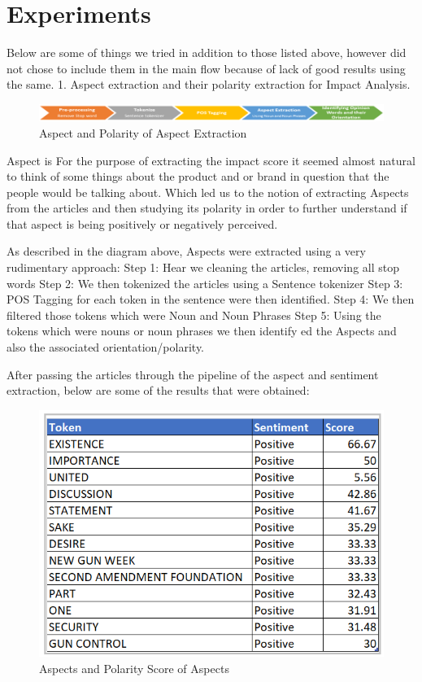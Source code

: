 \documentclass[paper=a4, fontsize=11pt]{scrartcl}
\numberwithin{equation}{section}		%
\numberwithin{figure}{section}			%
\numberwithin{table}{section}				%
\begin{document}
\section{Experiments}
Below are some of things we tried in addition to those listed above, however did not chose to include them in the main flow because of lack of good results using the same.
1. Aspect extraction and their polarity extraction for Impact Analysis. 
\begin{figure}
	\centering
 	 \includegraphics[width=0.6\linewidth]{Aspect_Extraction.png}
	  \caption{Aspect and Polarity of Aspect Extraction}
 	 \label{fig:Aspect Extraction.png}
\end{figure}
Aspect is 
For the purpose of extracting the impact score it seemed almost natural to think of some things about the product and or brand in question that the people would be talking about. Which led us to the notion of extracting Aspects from the articles and then studying its polarity in order to further understand if that aspect is being positively or negatively perceived.

As described in the diagram above, Aspects were extracted using a very rudimentary approach: 
{Step 1: Hear we cleaning the articles, removing all stop words}
{Step 2: We then tokenized the articles using a Sentence tokenizer}
{Step 3: POS Tagging for each token in the sentence were then identified.}  
{Step 4: We then filtered those tokens which were Noun and Noun Phrases}
{Step 5: Using the tokens which were nouns or noun phrases we then identify ed the Aspects and also the associated orientation/polarity.}

{After passing the articles through the pipeline of the aspect and sentiment extraction, below are some of the results that were obtained:}

\begin{figure}
	\centering
 	 \includegraphics[width=0.6\linewidth]{Aspect_Scores.png}
	  \caption{Aspects and Polarity Score of Aspects}
 	 \label{fig:Aspect Extraction.png}
\end{figure}
\end{document}
